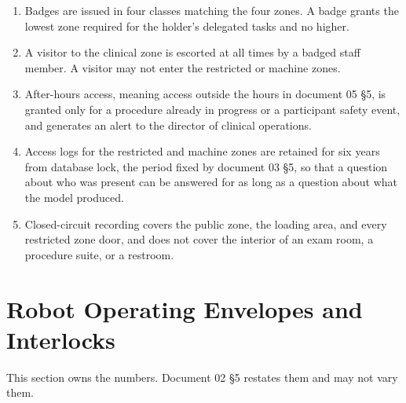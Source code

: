 \begin{enumerate}
\item Badges are issued in four classes matching the four zones. A badge grants
  the lowest zone required for the holder's delegated tasks and no higher.

\item A visitor to the clinical zone is escorted at all times by a badged staff
  member. A visitor may not enter the restricted or machine zones.

\item After-hours access, meaning access outside the hours in document 05 §5, is
  granted only for a procedure already in progress or a participant safety
  event, and generates an alert to the director of clinical operations.

\item Access logs for the restricted and machine zones are retained for six
  years from database lock, the period fixed by document 03 §5, so that a
  question about who was present can be answered for as long as a question about
  what the model produced.

\item Closed-circuit recording covers the public zone, the loading area, and
  every restricted zone door, and does not cover the interior of an exam room, a
  procedure suite, or a restroom.
\end{enumerate}

\section{Robot Operating Envelopes and Interlocks}

This section owns the numbers. Document 02 §5 restates them and may not vary
them.

